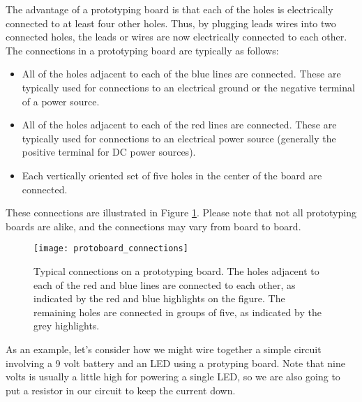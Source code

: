 The advantage of a prototyping board is that each of the holes is electrically 
connected to at least four other holes. Thus, by plugging leads wires 
into two connected holes, the leads or wires are now electrically 
connected to each other. The connections in a prototyping board are typically
as follows:
\begin{itemize}
\item All of the holes adjacent to each of the blue lines are connected. 
These are typically used for connections to an electrical ground or the
negative terminal of a power source.
\item All of the holes adjacent to each of the red lines are connected.
These are typically used for connections to an electrical power source 
(generally the positive terminal for DC power sources).
\item Each vertically oriented set of five holes in the center of the board
are connected.
\end{itemize}
These connections are illustrated in Figure \ref{fig:protoboard_connections}.
Please note that not all prototyping boards are alike, and the connections
may vary from board to board.
\begin{figure}[hbp!]
\centering
\texttt{[image: protoboard\_connections]}
\caption[Typical connections on a prototyping board]{Typical connections on a
prototyping board. The holes adjacent to each of the red and blue lines are
connected to each other, as indicated by the red and blue highlights on
the figure. The remaining holes are connected in groups of five, as indicated
by the grey highlights.}
\label{fig:protoboard_connections}
\end{figure}

As an example, let's consider how we might wire together a simple circuit 
involving a 9 volt battery and an LED using a protyping board. Note that 
nine volts is usually a little high for powering a single LED, so we are also
going to put a resistor in our circuit to keep the current down.

